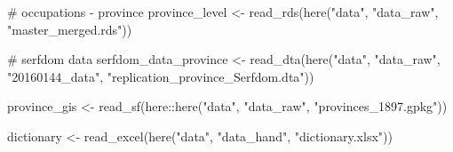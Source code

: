 \documentclass[
  9pt,
  letterpaper,
  DIV=11,
  numbers=noendperiod]{scrartcl}
\newenvironment{Shaded}{\begin{snugshade}}{\end{snugshade}}
\newcommand{\CommentTok}[1]{\textcolor[rgb]{0.48,0.49,0.49}{#1}}
\newcommand{\FunctionTok}[1]{\textcolor[rgb]{0.56,0.27,0.68}{#1}}
\newcommand{\NormalTok}[1]{\textcolor[rgb]{0.81,0.81,0.76}{#1}}
\newcommand{\OtherTok}[1]{\textcolor[rgb]{0.15,0.68,0.38}{#1}}
\newcommand{\SpecialCharTok}[1]{\textcolor[rgb]{0.24,0.68,0.91}{#1}}
\newcommand{\StringTok}[1]{\textcolor[rgb]{0.96,0.31,0.31}{#1}}
\begin{document}
\begin{Shaded}
\begin{Highlighting}[]
  \CommentTok{\# occupations {-} province}
\NormalTok{  province\_level }\OtherTok{\textless{}{-}} \FunctionTok{read\_rds}\NormalTok{(}\FunctionTok{here}\NormalTok{(}\StringTok{"data"}\NormalTok{, }\StringTok{"data\_raw"}\NormalTok{, }\StringTok{"master\_merged.rds"}\NormalTok{))}
  
  \CommentTok{\# serfdom data}
\NormalTok{  serfdom\_data\_province }\OtherTok{\textless{}{-}} \FunctionTok{read\_dta}\NormalTok{(}\FunctionTok{here}\NormalTok{(}\StringTok{"data"}\NormalTok{, }\StringTok{"data\_raw"}\NormalTok{,}
                                          \StringTok{"20160144\_data"}\NormalTok{,}
                                          \StringTok{"replication\_province\_Serfdom.dta"}\NormalTok{))}

\NormalTok{  province\_gis }\OtherTok{\textless{}{-}} \FunctionTok{read\_sf}\NormalTok{(here}\SpecialCharTok{::}\FunctionTok{here}\NormalTok{(}\StringTok{"data"}\NormalTok{, }\StringTok{"data\_raw"}\NormalTok{, }\StringTok{"provinces\_1897.gpkg"}\NormalTok{))}

\NormalTok{  dictionary }\OtherTok{\textless{}{-}} \FunctionTok{read\_excel}\NormalTok{(}\FunctionTok{here}\NormalTok{(}\StringTok{"data"}\NormalTok{, }\StringTok{"data\_hand"}\NormalTok{, }\StringTok{"dictionary.xlsx"}\NormalTok{))}
\end{Highlighting}
\end{Shaded}
\end{document}
